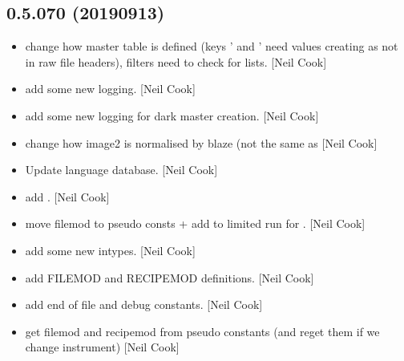 \documentclass[a4paper,10pt,english]{report}
\begin{document}
\subsection{0.5.070 (2019\sphinxhyphen{}09\sphinxhyphen{}13)}
\label{\detokenize{misc/changelog:id91}}\begin{itemize}
\item {} 
 \sphinxhyphen{} change how master table is defined (keys
’ and ’ need values creating as not in raw
file headers), filters need to check for lists. {[}Neil Cook{]}

\item {} 
 \sphinxhyphen{} add some new logging. {[}Neil Cook{]}

\item {} 
 \sphinxhyphen{} add some new logging for dark master creation.
{[}Neil Cook{]}

\item {} 
 \sphinxhyphen{} change how image2 is
normalised by blaze (not the same as  {[}Neil Cook{]}

\item {} 
Update language database. {[}Neil Cook{]}

\item {} 
 \sphinxhyphen{} add . {[}Neil Cook{]}

\item {} 
 \sphinxhyphen{} move filemod to pseudo
consts + add  to limited run for . {[}Neil
Cook{]}

\item {} 
 \sphinxhyphen{} add some new intypes. {[}Neil Cook{]}

\item {} 
 \sphinxhyphen{} add FILEMOD and RECIPEMOD
definitions. {[}Neil Cook{]}

\item {} 
 \sphinxhyphen{} add end of file and debug constants.
{[}Neil Cook{]}

\item {} 
 \sphinxhyphen{} get filemod and recipemod from pseudo
constants (and re\sphinxhyphen{}get them if we change instrument) {[}Neil Cook{]}


\end{itemize}
\end{document}
